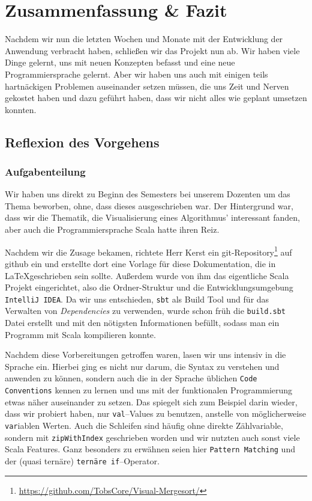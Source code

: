 \chapter{Zusammenfassung \& Fazit}\label{chap:zusammenfassung-und-fazit}
Nachdem wir nun die letzten Wochen und Monate mit der Entwicklung der Anwendung verbracht haben, schließen wir das Projekt nun ab. Wir haben viele Dinge gelernt, uns mit neuen Konzepten befasst und eine neue Programmiersprache gelernt. Aber wir haben uns auch mit einigen teils hartnäckigen Problemen auseinander setzen müssen, die uns Zeit und Nerven gekostet haben und dazu geführt haben, dass wir nicht alles wie geplant umsetzen konnten.

\section{Reflexion des Vorgehens}\label{sec:reflexion}
\subsection{Aufgabenteilung}
Wir haben uns direkt zu Beginn des Semesters bei unserem Dozenten um das Thema beworben, ohne, dass dieses ausgeschrieben war. Der Hintergrund war, dass wir die Thematik, die Visualisierung eines Algorithmus' interessant fanden, aber auch die Programmiersprache Scala hatte ihren Reiz.

Nachdem wir die Zusage bekamen, richtete Herr Kerst ein git-Repository\footnote{\url{https://github.com/TobsCore/Visual-Mergesort/}} auf github ein und erstellte dort eine Vorlage für diese Dokumentation, die in \LaTeX geschrieben sein sollte. Außerdem wurde von ihm das eigentliche Scala Projekt eingerichtet, also die Ordner-Struktur und die Entwicklungsumgebung \texttt{IntelliJ IDEA}. Da wir uns entschieden, \texttt{sbt} als Build Tool und für das Verwalten von \textit{Dependencies} zu verwenden, wurde schon früh die \texttt{build.sbt} Datei erstellt und mit den nötigsten Informationen befüllt, sodass man ein Programm mit Scala kompilieren konnte.

Nachdem diese Vorbereitungen getroffen waren, lasen wir uns intensiv in die Sprache ein. Hierbei ging es nicht nur darum, die Syntax zu verstehen und anwenden zu können, sondern auch die in der Sprache üblichen \texttt{Code Conventions} kennen zu lernen und uns mit der funktionalen Programmierung etwas näher auseinander zu setzen. Das spiegelt sich zum Beispiel darin wieder, dass wir probiert haben, nur \texttt{val}--Values zu benutzen, anstelle von möglicherweise \texttt{var}iablen Werten. Auch die Schleifen sind häufig ohne direkte Zählvariable, sondern mit \texttt{zipWithIndex} geschrieben worden und wir nutzten auch sonst viele Scala Features. Ganz besonders zu erwähnen seien hier \texttt{Pattern Matching} und der (quasi ternäre) \texttt{ternäre if}--Operator.


